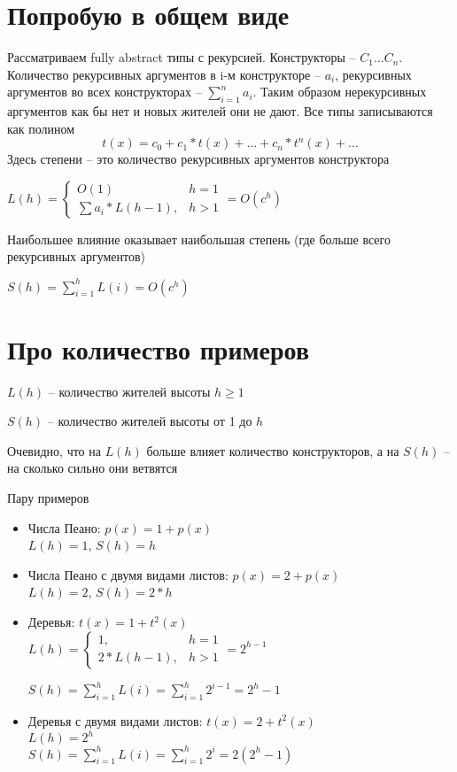 \documentclass{article}
\begin{document}
\section{Попробую в общем виде}
Рассматриваем fully abstract типы с рекурсией. Конструкторы -- $C_1\dots C_n$. Количество рекурсивных аргументов в i-м конструкторе -- $a_i$, рекурсивных аргументов во всех конструкторах -- $\sum_{i=1}^{n} a_i$. Таким образом нерекурсивных аргументов как бы нет и новых жителей они не дают. Все типы записываются как полином
\[
t(x) = c_0 + c_1*t(x) + \dots + c_n*t^n(x) + ...
\]
Здесь степени -- это количество рекурсивных аргументов конструктора


$L(h) = \begin{cases}
O(1) & h=1\\
\sum{a_i} * L(h-1),&h>1
\end{cases} = O(c^h)$

Наибольшее влияние оказывает наибольшая степень (где больше всего рекурсивных аргументов)

$S(h) = \sum_{i=1}^{h} L(i)  = O(c^h)$


\section{Про количество примеров}

$L(h)$ -- количество жителей высоты $h\ge 1$

$S(h)$ -- количество жителей высоты от 1 до $h$

Очевидно, что на $L(h)$ больше влияет количество конструкторов, а на $S(h)$ -- на сколько сильно они ветвятся

Пару примеров
\begin{itemize}
\item Числа Пеано: $p(x) = 1 + p(x)$\\ $L(h) = 1$, $S(h) = h$

\item Числа Пеано с двумя видами листов: $p(x) = 2 + p(x)$\\
$L(h) = 2$, $S(h) = 2*h$
\item Деревья: $t(x) = 1 + t^2(x)$\\
$L(h) = \begin{cases}
1, & h=1\\
2*L(h-1),&h>1
\end{cases} = 2^{h-1}$

$S(h) = \sum_{i=1}^{h} L(i) =\sum_{i=1}^{h} 2^{i-1} =2^h - 1$

\item Деревья с двумя видами листов: $t(x) = 2 + t^2(x)$\\
$L(h) = 2^h$\\

$S(h) = \sum_{i=1}^{h} L(i) =\sum_{i=1}^{h} 2^{i} =2(2^h - 1)$

\end{itemize}
\end{document}
